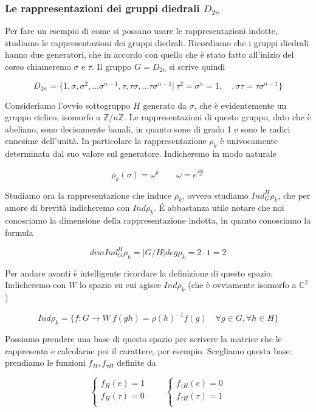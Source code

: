 \documentclass[11pt]{article}
\theoremstyle{plain}
\theoremstyle{definition}
\theoremstyle{remark}
\newcommand{\C}{\mathbb{C}}
\newcommand{\Z}{\mathbb{Z}}
\begin{document}
\subsubsection{Le rappresentazioni dei gruppi diedrali $D_{2n}$}
Per fare un esempio di come si possano usare le rappresentazioni indotte, studiamo le rappresentazioni dei gruppi diedrali. Ricordiamo che i gruppi diedrali hanno due generatori, che in accordo con quello che è stato fatto all'inizio del corso chiameremo $\sigma$ e $\tau$. Il gruppo $G = D_{2n}$ si scrive quindi

\[ D_{2n} = \{ 1, \sigma, \sigma^2, ... \sigma^{n-1}, \tau, \tau\sigma, ... \tau\sigma^{n-1} | \ \tau^2 = \sigma^n = 1, \quad, \sigma\tau = \tau\sigma^{n-1} \}\]


Consideriamo l'ovvio sottogruppo $H$ generato da $\sigma$, che è evidentemente un gruppo ciclico, isomorfo a $\Z / n \Z$. Le rappresentazioni di questo gruppo, dato che è abeliano, sono decisamente banali, in quanto sono di grado 1 e sono le radici ennesime dell'unità. In particolare la rappresentazione $\rho_k$ è univocamente determinata dal suo valore sul generatore. Indicheremo in modo naturale

\[\rho_k(\sigma) = \omega^k  \qquad \omega = e^{\frac{2\pi i}{n}}\]


Studiamo ora la rappresentazione che induce $\rho_k$, ovvero studiamo $Ind_G^H \rho_k$, che per amore di brevità indicheremo con $Ind \rho_k$. \'E abbastanza utile notare che noi conosciamo la dimensione della rappresentazione indotta, in quanto conosciamo la formula

\[ dim Ind^H_G \rho_k = |G/H| deg \rho_k = 2 \cdot 1 = 2\]

Per andare avanti è intelligente ricordare la definizione di questo spazio. Indicheremo con $W$ lo spazio su cui agisce $Ind \rho_k$ (che è ovviamente isomorfo a $\C^2$)


\[ Ind \rho_k = \{ f : G \to W \ f(gh) = \rho(h)^{-1} f(g) \quad \forall g \in G, \forall h \in H \}\]

Possiamo prendere una base di questo spazio per scrivere la matrice che le rappresenta e calcolarne poi il carattere, per esempio. Scegliamo questa base: prendiamo le funzioni $f_H, f_{\tau H}$ definite da 

\[ 
\begin{cases}
f_H (e) = 1 \\
f_H (\tau) = 0 \\
\end{cases}
\qquad
\begin{cases}
f_{\tau H} (e) = 0 \\
f_{\tau H } (\tau) = 1 \\
\end{cases}
\]
\end{document}
